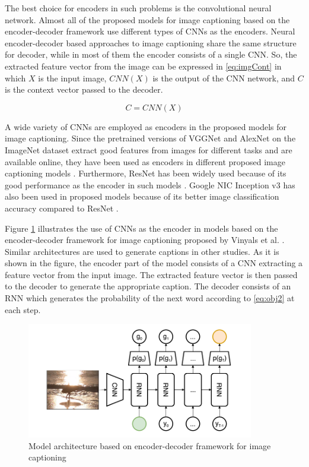 \documentclass[preprint, 12pt]{elsarticle}
\begin{document}
		The best choice for encoders in such problems is the convolutional neural network. Almost all of the proposed models for image captioning based on the encoder-decoder framework use different types of CNNs as the encoders. Neural encoder-decoder based approaches to image captioning share the same structure for decoder, while in most of them the encoder consists of a single CNN. So, the extracted feature vector from the image can be expressed in \eqref{eq:imgCont} in which $X$ is the input image, $CNN(X)$ is the output of the CNN network, and $C$ is the context vector passed to the decoder.
		
		\begin{equation}
			C = CNN(X)
			\label{eq:imgCont}
		\end{equation} 
		
		A wide variety of CNNs are employed as encoders in the proposed models for image captioning. Since the pretrained versions of VGGNet \cite{simonyan2014very} and AlexNet \cite{krizhevsky2012imagenet} on the ImageNet dataset \cite{deng2009imagenet} extract good features from images for different tasks and are available online, they have been used as encoders in different proposed image captioning models \cite{karpathy2015deep} \cite{chen2017sca} \cite{pedersoli2017areas}. Furthermore, ResNet\cite{he2016deep} has been widely used because of its good performance as the encoder in such models \cite{lu2017knowing} \cite{rennie2017self} \cite{anderson2017bottom} \cite{yao2017boosting}. Google NIC Inception v3 \cite{szegedy2016rethinking} has also been used in proposed models because of its better image classification accuracy compared to ResNet \cite{zhang2017actor} \cite{ioffe2015batch} \cite{vinyals2015show} \cite{liu2017improved}. 
		
		Figure \ref{fig:imgCpt} illustrates the use of CNNs as the encoder in models based on the encoder-decoder framework for image captioning proposed by Vinyals et al. \cite{vinyals2015show}. Similar architectures are used to generate captions in other studies. As it is shown in the figure, the encoder part of the model consists of a CNN extracting a feature vector from the input image. The extracted feature vector is then passed to the decoder to generate the appropriate caption. The decoder consists of an RNN which generates the probability of the next word according to \eqref{eq:obj2} at each step.
		
		\begin{figure}[h]
			\centering
			\includegraphics[scale=1]{Imgs/CNNImgCpt.png}
			\caption{Model architecture based on encoder-decoder framework for image captioning \cite{vinyals2015show}}
			\label{fig:imgCpt}
		\end{figure}
		
\end{document}
